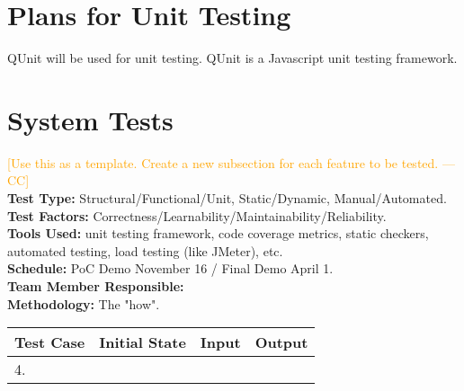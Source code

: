 \documentclass[12pt]{article}
\newcommand{\authornote}[3]{\textcolor{#1}{[#3 ---#2]}}
\newcommand{\authornote}[3]{}
\newcommand{\cc}[1]{\authornote{orange}{CC}{#1}}
\begin{document}
\section{Plans for Unit Testing}
QUnit will be used for unit testing. QUnit is a Javascript unit testing framework.


\section{System Tests}

\cc{Use this as a template. Create a new subsection for each feature to be tested.}\\
\textbf{Test Type:} Structural/Functional/Unit, Static/Dynamic, Manual/Automated. \\
\textbf{Test Factors:} Correctness/Learnability/Maintainability/Reliability. \\
\textbf{Tools Used:} unit testing framework, code coverage metrics, static checkers, automated testing, load testing (like JMeter), etc. \\ 
\textbf{Schedule:} PoC Demo November 16 / Final Demo April 1. \\
\textbf{Team Member Responsible:} \\
\textbf{Methodology:} The "how".

\begin{longtable}{|p{2cm}|p{3cm}|p{5cm}|p{5cm}|}
\hline
\textbf{Test Case}  & \textbf{Initial State} & \textbf{Input} & \textbf{Output} \\ \hline
4. & & &  \\ 
\hline
\end{longtable}



\end{document}
